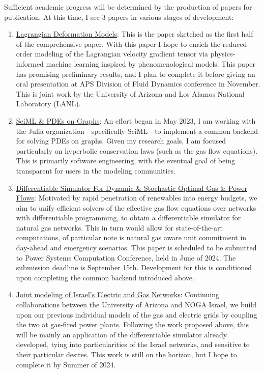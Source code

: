 \documentclass{article}
\begin{document}
Sufficient academic progress will be determined by the production of papers for publication. At this time, I see 3 papers in various stages of development:
\begin{enumerate}
\item \underline{Lagrangian Deformation Models}: This is the paper sketched as the first half of the comprehensive paper. With this paper I hope to enrich the reduced order modeling of the Lagrangian velocity gradient tensor via physics-informed machine learning inspired by phenomenological models. This paper has promising preliminary results, and I plan to complete it before giving an oral presentation at APS Division of Fluid Dynamics conference in November. This is joint work by the University of Arizona and Los Alamos National Laboratory (LANL).

\item \underline{SciML \& PDEs on Graphs}: An effort began in May 2023, I am working with the Julia organization - specifically SciML - to implement a common backend for solving PDEs on graphs. Given my research goals, I am focused particularly on hyperbolic conservation laws (such as the gas flow equations). This is primarily software engineering, with the eventual goal of being transparent for users in the modeling communities.
  
\item \underline{Differentiable Simulator For Dynamic \& Stochastic Optimal Gas \& Power Flows}: Motivated by rapid penetration of renewables into energy budgets, we aim to unify efficient solvers of the effective gas flow equations over networks with differentiable programming, to obtain a differentiable simulator for natural gas networks. This in turn would allow for state-of-the-art computations, of particular note is natural gas aware unit commitment in day-ahead and emergency scenarios. This paper is scheduled to be submitted to Power Systems Computation Conference, held in June of 2024. The submission deadline is September 15th. Development for this is conditioned upon completing the common backend introduced above.

\item \underline{Joint modeling of Israel's Electric and Gas Networks}: Continuing collaborations between the University of Arizona and NOGA Israel, we build upon our previous individual models of the gas and electric grids by coupling the two at gas-fired power plants. Following the work proposed above, this will be mainly an application of the differentiable simulator already developed, tying into particularities of the Israel networks, and sensitive to their particular desires. This work is still on the horizon, but I hope to complete it by Summer of 2024.


\end{enumerate}
\end{document}
